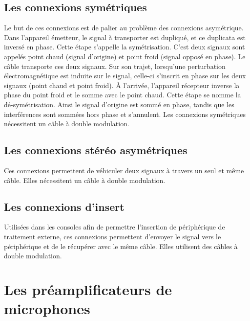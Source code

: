 \documentclass[
]{book}
\begin{document}
\hypertarget{les-connexions-symuxe9triques}{%
\section{Les connexions symétriques}\label{les-connexions-symuxe9triques}}

Le but de ces connexions est de palier au problème des connexions asymétrique. Dans l'appareil émetteur, le signal à transporter est dupliqué, et ce duplicata est inversé en phase. Cette étape s'appelle la symétrisation. C'est deux signaux sont appelés point chaud (signal d'origine) et point froid (signal opposé en phase). Le câble transporte ces deux signaux. Sur son trajet, lorsqu'une perturbation électromagnétique est induite sur le signal, celle-ci s'inscrit en phase sur les deux signaux (point chaud et point froid). À l'arrivée, l'appareil récepteur inverse la phase du point froid et le somme avec le point chaud. Cette étape se nomme la dé-symétrisation. Ainsi le signal d'origine est sommé en phase, tandis que les interférences sont sommées hors phase et s'annulent.
Les connexions symétriques nécessitent un câble à double modulation.

\hypertarget{les-connexions-stuxe9ruxe9o-asymuxe9triques}{%
\section{Les connexions stéréo asymétriques}\label{les-connexions-stuxe9ruxe9o-asymuxe9triques}}

Ces connexions permettent de véhiculer deux signaux à travers un seul et même câble. Elles nécessitent un câble à double modulation.

\hypertarget{les-connexions-dinsert}{%
\section{Les connexions d'insert}\label{les-connexions-dinsert}}

Utilisées dans les consoles afin de permettre l'insertion de périphérique de traitement externe, ces connexions permettent d'envoyer le signal vers le périphérique et de le récupérer avec le même câble. Elles utilisent des câbles à double modulation.

\hypertarget{les-pruxe9amplificateurs-de-microphones}{%
\chapter{Les préamplificateurs de microphones}\label{les-pruxe9amplificateurs-de-microphones}}
\end{document}
